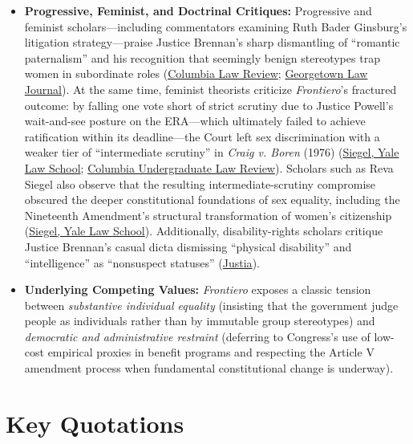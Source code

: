 \documentclass[12pt]{article}
\begin{document}
\begin{itemize}
    \item \textbf{Progressive, Feminist, and Doctrinal Critiques:} Progressive and feminist scholars---including commentators examining Ruth Bader Ginsburg's litigation strategy---praise Justice Brennan's sharp dismantling of ``romantic paternalism'' and his recognition that seemingly benign stereotypes trap women in subordinate roles (\href{https://columbialawreview.org/content/goodbye-old-friend-tribute-to-justice-ruth-bader-ginsburg/}{Columbia Law Review}; \href{https://www.law.georgetown.edu/georgetown-law-journal/wp-content/uploads/sites/26/2022/09/Suk-Justice-Ginsburgs-Cautious-Legacy.pdf}{Georgetown Law Journal}). At the same time, feminist theorists criticize \textit{Frontiero}'s fractured outcome: by falling one vote short of strict scrutiny due to Justice Powell's wait-and-see posture on the ERA---which ultimately failed to achieve ratification within its deadline---the Court left sex discrimination with a weaker tier of ``intermediate scrutiny'' in \textit{Craig v. Boren} (1976) (\href{https://law.yale.edu/sites/default/files/documents/pdf/Faculty/Siegel_SheThePeople.pdf}{Siegel, Yale Law School}; \href{https://www.culawreview.org/journal/bringing-sex-discrimination-under-strict-scrutiny-the-need-for-an-equal-rights-amendment}{Columbia Undergraduate Law Review}). Scholars such as Reva Siegel also observe that the resulting intermediate-scrutiny compromise obscured the deeper constitutional foundations of sex equality, including the Nineteenth Amendment's structural transformation of women's citizenship (\href{https://law.yale.edu/sites/default/files/documents/pdf/Faculty/Siegel_SheThePeople.pdf}{Siegel, Yale Law School}). Additionally, disability-rights scholars critique Justice Brennan's casual dicta dismissing ``physical disability'' and ``intelligence'' as ``nonsuspect statuses'' (\href{https://supreme.justia.com/cases/federal/us/411/677/}{Justia}).
    \item \textbf{Underlying Competing Values:} \textit{Frontiero} exposes a classic tension between \emph{substantive individual equality} (insisting that the government judge people as individuals rather than by immutable group stereotypes) and \emph{democratic and administrative restraint} (deferring to Congress's use of low-cost empirical proxies in benefit programs and respecting the Article V amendment process when fundamental constitutional change is underway).
\end{itemize}

\section{Key Quotations}
\end{document}
